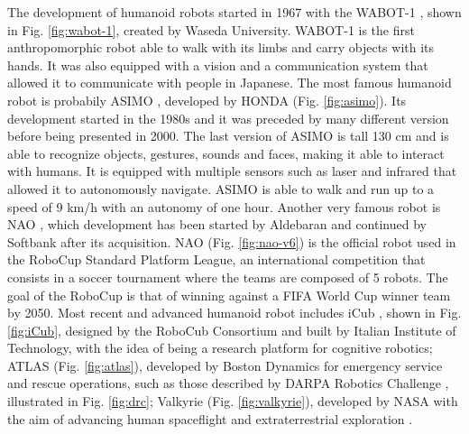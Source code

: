 The development of humanoid robots started in 1967 with the WABOT-1
\cite{Kato1973TheWABOT1AI}, shown in Fig. \ref{fig:wabot-1}, created by Waseda
University. WABOT-1 is
the first anthropomorphic robot able to 
walk with its limbs and carry objects with its hands. It was also equipped with 
a vision and a communication system that allowed it to communicate with people 
in Japanese. The most famous humanoid robot is probabily ASIMO
\cite{Sakagami2002TheIntelligentASIMO}, developed by HONDA (Fig.
\ref{fig:asimo}). Its development started in the
1980s and it was preceded by many different version before being presented in
2000.
The last version of ASIMO is tall 130 cm and is able to recognize objects,
gestures, sounds and 
faces, making it able to interact with humans. It is equipped with multiple 
sensors such as laser and infrared that allowed it to autonomously 
navigate. ASIMO is able to walk and run up to a speed of 9 km/h with an 
autonomy of one hour. Another very famous robot is NAO \cite{NAOdesign},
which development has been started by Aldebaran and continued by Softbank after 
its acquisition. NAO (Fig. \ref{fig:nao-v6}) is the official robot used in 
the RoboCup \cite{Kitano1997RoboCup} Standard Platform League, an international
competition that consists in a soccer tournament where the teams are composed 
of 5 robots. The goal of the RoboCup is that of winning against a FIFA
World Cup winner team by 2050. Most recent and advanced humanoid robot 
includes iCub \cite{Sandini2007iCub}, shown in Fig. \ref{fig:iCub}, designed 
by the RoboCub Consortium and built by Italian Institute of Technology,
with the idea of being a research platform for cognitive robotics;
ATLAS (Fig. \ref{fig:atlas}), developed by Boston Dynamics for emergency service
and rescue operations, such as those described by DARPA Robotics Challenge
\cite{Atkenson2018DARPARoboticsChallengeFinals}, illustrated in Fig.
\ref{fig:drc}; Valkyrie (Fig. \ref{fig:valkyrie}), developed by NASA with the 
aim of advancing human spaceflight and extraterrestrial exploration
\cite{Radford2015Valkyrie}.

